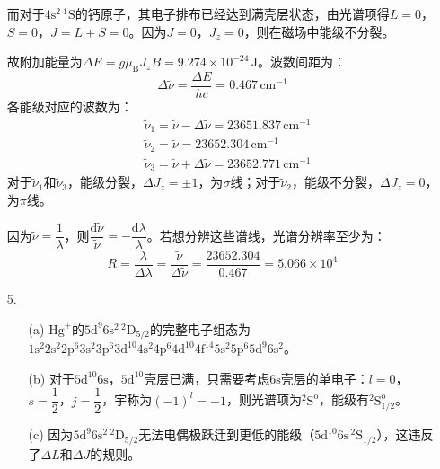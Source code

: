 \documentclass[a4paper]{article}
\begin{document}
\begin{enumerate}
    而对于$\mathrm{4s^2\,^1S}$的钙原子，其电子排布已经达到满壳层状态，由光谱项得$L=0$，$S=0$，$J=L+S=0$。因为$J=0$，$J_z=0$，则在磁场中能级不分裂。

    故附加能量为$\Delta E=g \mu_{\mathrm{B}}J_z B=9.274\times10^{-24}\,\mathrm{J}$。波数间距为：
    \[
        \Delta\tilde{\nu}=\dfrac{\Delta E}{hc} = 0.467\,\mathrm{cm^{-1}}
    \]
    各能级对应的波数为：
    \begin{align*}
        &\tilde{\nu}_1 = \tilde{\nu} - \Delta\tilde{\nu} = 23651.837\,\mathrm{cm^{-1}} \\
        &\tilde{\nu}_2 = \tilde{\nu} = 23652.304\,\mathrm{cm^{-1}} \\
        &\tilde{\nu}_3 = \tilde{\nu} + \Delta\tilde{\nu} = 23652.771\,\mathrm{cm^{-1}}
    \end{align*}
    对于$\tilde{\nu}_1$和$\tilde{\nu}_3$，能级分裂，$\Delta J_z=\pm1$，为$\sigma$线；对于$\tilde{\nu}_2$，能级不分裂，$\Delta J_z=0$，为$\pi$线。
    
    因为$\tilde{\nu}=\dfrac{1}{\lambda}$，则$\dfrac{\mathrm{d}\tilde{\nu}}{\tilde{\nu}}=-\dfrac{\mathrm{d}\lambda}{\lambda}$。若想分辨这些谱线，光谱分辨率至少为：
    \[
        R = \frac{\lambda}{\Delta\lambda} = \frac{\tilde{\nu}}{\Delta\tilde{\nu}} = \frac{23652.304}{0.467} = 5.066\times10^4
    \]

    \bigskip
    \item[5.]
    \begin{enumerate}
        \item[(a)]
        $\mathrm{Hg}^+$的$\mathrm{5d^9 6s^2\,^2D_{5/2}}$的完整电子组态为$\mathrm{1s^2 2s^2 2p^6 3s^2 3p^6 3d^{10} 4s^2 4p^6 4d^{10} 4f^{14} 5s^2 5p^6 5d^9 6s^2}$。

        \item[(b)]
        对于$\mathrm{5d^{10} 6s}$，$\mathrm{5d^{10}}$壳层已满，只需要考虑$\mathrm{6s}$壳层的单电子：$l=0$，$s=\dfrac{1}{2}$，$j=\dfrac{1}{2}$，宇称为$(-1)^l=-1$，则光谱项为$\mathrm{^2S^o}$，能级有$\mathrm{^2S_{1/2}^o}$。

        \item[(c)]
        因为$\mathrm{5d^9 6s^2\,^2D_{5/2}}$无法电偶极跃迁到更低的能级（$\mathrm{5d^{10} 6s\,^2S_{1/2}}$），这违反了$\Delta L$和$\Delta J$的规则。
    \end{enumerate}

\end{enumerate}
\end{document}
